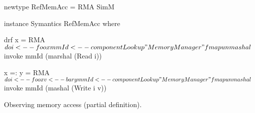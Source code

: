 \begin{figure}
\begin{code}
newtype RefMemAcc =  RMA SimM

instance Symantics RefMemAcc where

  drf x = RMA $ do
    i     <-- foo x
    mmId  <-- componentLookup "MemoryManager"
    fmap unmashal $ invoke mmId (marshal (Read i))

  x =: y = RMA $ do
    i     <-- foo x
    v     <-- bar y
    mmId  <-- componentLookup "MemoryManager"
    fmap unmashal $ invoke mmId (mashal (Write i v))
\end{code}
\caption{Observing memory access (partial definition).}
\label{lst_observing_memory_access}
\end{figure}


%
%

%
%
%
%

